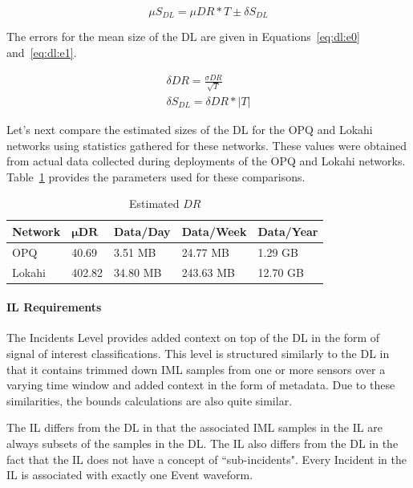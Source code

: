 \begin{equation}\label{eq:dl:mu_s_dl}
	\mu S_{DL} = \mu DR * T \pm \delta S_{DL}
\end{equation}

The errors for the mean size of the DL are given in Equations~\ref{eq:dl:e0} and~\ref{eq:dl:e1}.

\begin{align}
	\delta DR = \frac{\sigma DR}{\sqrt{T}} \label{eq:dl:e0} \\
	\delta S_{DL} = \delta {DR} * |T| \label{eq:dl:e1}
\end{align}

Let's next compare the estimated sizes of the DL for the OPQ and Lokahi networks using statistics gathered for these networks. These values were obtained from actual data collected during deployments of the OPQ and Lokahi networks. Table~\ref{table:estimated_mu_dr} provides the parameters used for these comparisons.

\begin{table}[H]
	\centering
	\caption{Estimated $DR$}
	\begin{tabularx}{\textwidth}{lllll}
		\toprule
		\textbf{Network} & $\bm{\mu DR}$ & \textbf{Data/Day} & \textbf{Data/Week} & \textbf{Data/Year} \\
		\midrule
		OPQ & 40.69 & 3.51 MB & 24.77 MB & 1.29 GB \\
		Lokahi & 402.82 & 34.80 MB & 243.63 MB & 12.70 GB \\
		\bottomrule
	\end{tabularx}
	\label{table:estimated_mu_dr}
\end{table}

\paragraph{IL Requirements}
The Incidents Level provides added context on top of the DL in the form of signal of interest classifications. This level is structured similarly to the DL in that it contains trimmed down IML samples from one or more sensors over a varying time window and added context in the form of metadata. Due to these similarities, the bounds calculations are also quite similar.

The IL differs from the DL in that the associated IML samples in the IL are always subsets of the samples in the DL\@. The IL also differs from the DL in the fact that the IL does not have a concept of ``sub-incidents". Every Incident in the IL is associated with exactly one Event waveform.

